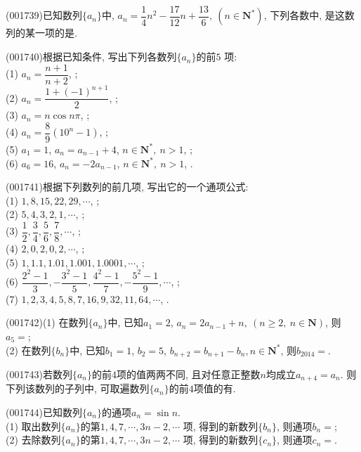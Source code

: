\item (001739)已知数列$\{a_n\}$中, $a_n=\dfrac{1}{4}n^2-\dfrac{17}{12}n+\dfrac{13}6, \ (n \in \mathbf{N}^*)$, 下列各数中, 是这数列的某一项的是.
\item (001740)根据已知条件, 写出下列各数列$\{a_n\}$的前$5$ 项:\\ 
(1) $a_n=\dfrac{n+1}{n+2}$, ;\\ 
(2) $a_n=\dfrac{1+(-1)^{n+1}}{2}$, ;\\ 
(3) $a_n=n\cos n\pi$, ;\\ 
(4) $a_n=\dfrac{8}{9}(10^n-1)$, ;\\ 
(5) $a_1=1$, $a_n=a_{n-1}+4$, $n \in \mathbf{N}^*, \ n>1$, ;\\ 
(6) $a_6=16$, $a_n=-2a_{n-1}$, $n\in \mathbf{N}^*, \ n>1$, .
\item (001741)根据下列数列的前几项, 写出它的一个通项公式:\\ 
(1) $1,8,15,22,29,\cdots$, ;\\ 
(2) $5,4,3,2,1,\cdots$, ;\\ 
(3) $\dfrac{1}{2},\dfrac{3}{4},\dfrac{5}{6},\dfrac{7}{8},\cdots$, ;\\ 
(4) $2,0,2,0,2,\cdots$, ;\\ 
(5) $1,1.1,1.01,1.001,1.0001,\cdots$, ;\\ 
(6) $\dfrac{2^2-1}{3},-\dfrac{3^2-1}{5},\dfrac{4^2-1}{7},-\dfrac{5^2-1}{9},\cdots$, ;\\ 
(7) $1,2,3,4,5,8,7,16,9,32,11,64,\cdots$, .
\item (001742)(1) 在数列$\{a_n\}$中, 已知$a_1=2$, $a_n=2a_{n-1}+n, \ (n \ge 2, \ n\in \mathbf{N})$, 则$a_5=$;\\ 
(2) 在数列$\{b_n\}$中, 已知$b_1=1$, $b_2=5$, $b_{n+2}=b_{n+1}-b_n, n \in \mathbf{N}^*$, 则$b_{2014}=$.
\item (001743)若数列$\{a_n\}$的前$4$项的值两两不同, 且对任意正整数$n$均成立$a_{n+4}=a_n$. 则下列该数列的子列中, 可取遍数列$\{a_n\}$的前$4$项值的有.
\item (001744)已知数列$\{a_n\}$的通项$a_n=\sin n$.\\ 
(1) 取出数列$\{a_n\}$的第$1,4,7,\cdots,3n-2,\cdots$ 项, 得到的新数列$\{b_n\}$, 则通项$b_n=$;\\ 
(2) 去除数列$\{a_n\}$的第$1,4,7,\cdots,3n-2,\cdots$ 项, 得到的新数列$\{c_n\}$, 则通项$c_n=$.
